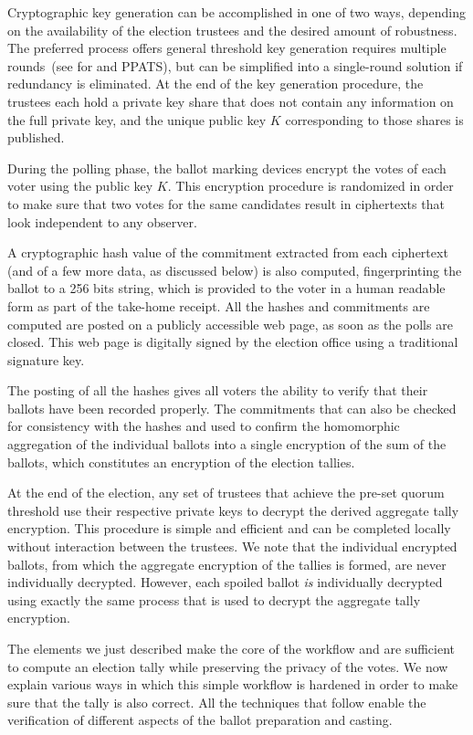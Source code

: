 Cryptographic key generation can be accomplished in one of two ways,
depending on the availability of the election trustees and the desired
amount of robustness. The preferred process offers general threshold
key generation requires multiple rounds~(see \cite{GJKR07} for
\elgamal and PPATS), but can be simplified into a single-round
solution if redundancy is eliminated.  At the end of the key
generation procedure, the trustees each hold a private key share that
does not contain any information on the full private key, and the
unique public key $K$ corresponding to those shares is published.

During the polling phase, the ballot marking devices encrypt the votes
of each voter using the public key $K$. This encryption procedure is
randomized in order to make sure that two votes for the same
candidates result in ciphertexts that look independent to any
observer. 

A cryptographic hash value of the commitment extracted from each
ciphertext (and of a few more data, as discussed below) is also
computed, fingerprinting the ballot to a 256 bits string, which is
provided to the voter in a human readable form as part of the
take-home receipt. All the hashes and commitments are computed are
posted on a publicly accessible web page, as soon as the polls are
closed. This web page is digitally signed by the election office using
a traditional signature key.

The posting of all the hashes gives all voters the ability to verify
that their ballots have been recorded properly.  The commitments that
can also be checked for consistency with the hashes and used to
confirm the homomorphic aggregation of the individual ballots into a
single encryption of the sum of the ballots, which constitutes an
encryption of the election tallies.

At the end of the election, any set of trustees that achieve the
pre-set quorum threshold use their respective private keys to decrypt
the derived aggregate tally encryption.  This procedure is simple and
efficient and can be completed locally without interaction between the
trustees.  We note that the individual encrypted ballots, from which
the aggregate encryption of the tallies is formed, are never
individually decrypted.  However, each spoiled ballot {\em is}
individually decrypted using exactly the same process that is used to
decrypt the aggregate tally encryption.

The elements we just described make the core of the workflow and are
sufficient to compute an election tally while preserving the privacy
of the votes. We now explain various ways in which this simple
workflow is hardened in order to make sure that the tally is also
correct. All the techniques that follow enable the verification of
different aspects of the ballot preparation and casting.

